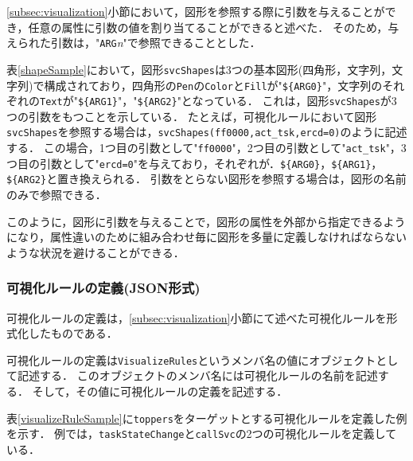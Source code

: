 \ref{subsec:visualization}小節において，図形を参照する際に引数を与えることができ，任意の属性に引数の値を割り当てることができると述べた．
そのため，与えられた引数は，"{\tt ARG}{\it n}"で参照できることとした．

表\ref{shapeSample}において，図形{\tt svcShapes}は3つの基本図形(四角形，文字列，文字列)で構成されており，四角形の{\tt Pen}の{\tt Color}と{\tt Fill}が"\verb|${ARG0}|"，文字列のそれぞれの{\tt Text}が"\verb|${ARG1}|"，"\verb|${ARG2}|"となっている．
これは，図形{\tt svcShapes}が3つの引数をもつことを示している．
たとえば，可視化ルールにおいて図形{\tt svcShapes}を参照する場合は，\verb|svcShapes(ff0000,act_tsk,ercd=0)|のように記述する．
この場合，1つ目の引数として"{\tt ff0000}"，2つ目の引数として"{\tt act\_tsk}"，3つ目の引数として"{\tt ercd=0}"を与えており，それぞれが．\verb|${ARG0}|，\verb|${ARG1}|，\verb|${ARG2}|と置き換えられる．
引数をとらない図形を参照する場合は，図形の名前のみで参照できる．

このように，図形に引数を与えることで，図形の属性を外部から指定できるようになり，属性違いのために組み合わせ毎に図形を多量に定義しなければならないような状況を避けることができる．

\subsubsection{可視化ルールの定義(JSON形式)}
可視化ルールの定義は，\ref{subsec:visualization}小節にて述べた可視化ルールを形式化したものである．

可視化ルールの定義は{\tt VisualizeRules}というメンバ名の値にオブジェクトとして記述する．
このオブジェクトのメンバ名には可視化ルールの名前を記述する．
そして，その値に可視化ルールの定義を記述する．

表\ref{visualizeRuleSample}に{\tt toppers}をターゲットとする可視化ルールを定義した例を示す．
例では，{\tt taskStateChange}と{\tt callSvc}の2つの可視化ルールを定義している．

